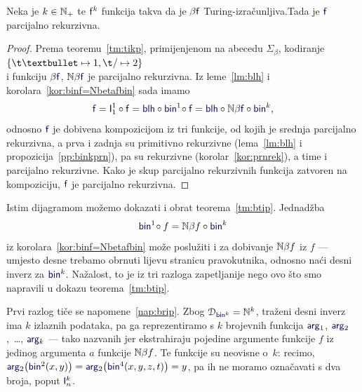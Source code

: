 
\begin{teorem}[{name=[parcijalna rekurzivnost Turing-izračunljivih brojevnih funkcija]}]\label{tm:btip}
Neka je $k\in{\mathbb N}_+$ te $\f f^k$ funkcija takva da je $\beta\f f$ Turing-izračunljiva.\newline Tada je $\f f$ parcijalno rekurzivna.
\end{teorem}
\begin{proof}
    Prema teoremu~\ref{tm:tikp}, primijenjenom na abecedu $\Sigma_\beta$, kodiranje $\{\t\textbullet\mapsto1,\t/\mapsto2\}$\\ i funkciju $\beta\f f$, $\N\beta\f f$ je parcijalno rekurzivna. Iz leme~\ref{lm:blh} i korolara~\ref{kor:binf=Nbetafbin} sada imamo
\begin{equation}
    \f f=\f I_1^1\circ\f f=\f{blh}\circ\f{bin}^1\!\circ\f f=\f{blh}\circ\N\beta\f f\circ\f{bin}^k\text,
\end{equation}
odnosno $\f f$ je dobivena kompozicijom iz tri funkcije, od kojih je srednja parcijalno rekurzivna, a prva i zadnja su primitivno rekurzivne (lema~\ref{lm:blh} i propozicija~\ref{pp:binkprn}), pa su rekurzivne (korolar~\ref{kor:prnrek}), a time i parcijalno rekurzivne. Kako je skup parcijalno rekurzivnih funkcija zatvoren na kompoziciju, $\f f$ je parcijalno rekurzivna.
\end{proof}

Istim dijagramom možemo dokazati i obrat teorema~\ref{tm:btip}. Jednadžba
\begin{equation}
    \f{bin}^1\!\circ f=\N\beta f\circ\f{bin}^k
\end{equation}
iz korolara~\ref{kor:binf=Nbetafbin} može poslužiti i za dobivanje ${\mathbb N}\beta f$ iz $f$ --- umjesto desne trebamo obrnuti lijevu stranicu pravokutnika, odnosno naći desni inverz za $\f{bin}^k$. Nažalost, to je iz tri razloga zapetljanije nego ovo što smo napravili u dokazu teorema~\ref{tm:btip}.

Prvi razlog tiče se napomene~\ref{nap:brip}. Zbog $\dom{\f{bin}^k}=\N^k$, traženi desni inverz ima $k$ izlaznih podataka, pa ga reprezentiramo s $k$ brojevnih funkcija $\f{arg}_1$, $\f{arg}_2$,~\ldots, $\f{arg}_k$ --- tako nazvanih jer ekstrahiraju pojedine argumente funkcije $f$ iz jedinog argumenta $a$ funkcije ${\mathbb N}\beta f$. Te funkcije su neovisne o~$k$: recimo, $\f{arg}_2\bigl(\f{bin}^2(x,y)\bigr)=\f{arg}_2\bigl(\f{bin}^4(x,y,z,t)\bigr)=y$, pa ih ne moramo označavati s dva broja, poput $\f I_n^k$.


